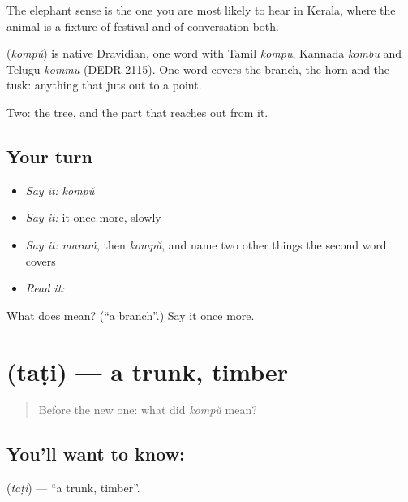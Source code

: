 The elephant sense is the one you are most likely to hear in Kerala, where the animal is a fixture of festival and of conversation both.

\begin{cousinweb}
\textbf{} (\emph{kompŭ}) is native Dravidian, one word with Tamil \emph{kompu}, Kannada \emph{kombu} and Telugu \emph{kommu} (DEDR 2115). One word covers the branch, the horn and the tusk: anything that juts out to a point.
\end{cousinweb}

\begin{grammarlens}[title={What you've built}]
Two: the tree, and the part that reaches out from it.
\end{grammarlens}

\subsection*{Your turn}
\begin{itemize}
\raggedright
  \item \emph{Say it:} \emph{kompŭ}
  \item \emph{Say it:} it once more, slowly
  \item \emph{Say it:} \emph{maraṁ}, then \emph{kompŭ}, and name two other things the second word covers
  \item \emph{Read it:} \textbf{}
\end{itemize}

\begin{tcolorbox}[breakable,colback=teal!4,colframe=teal!35!black,title={Before you move on}]
What does  mean? (\textquotedblleft{}a branch\textquotedblright{}.) Say it once more.
\end{tcolorbox}
\section[\texorpdfstring{\ml{തടി} (taṭi)}{തടി (taṭi)}]{ (taṭi) — a trunk, timber}

\label{lesson:ML-C54-trunk}



\begin{quote}
Before the new one: what did \emph{kompŭ} mean?
\end{quote}

\subsection*{You'll want to know: }
\textbf{} (\emph{taṭi}) — \textquotedblleft{}a trunk, timber\textquotedblright{}.

